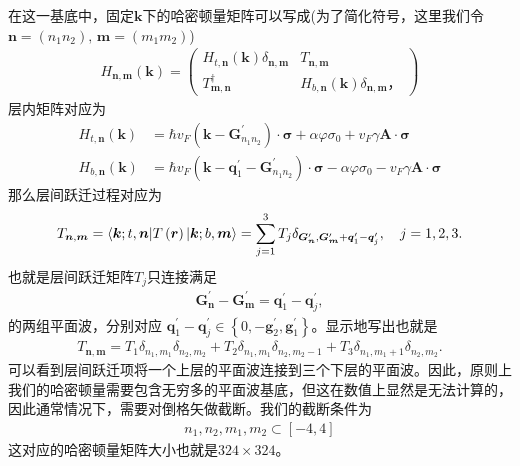 \documentclass[10pt, oneside]{article}
\begin{document}
在这一基底中，固定\(\bm{k }\)下的哈密顿量矩阵可以写成(为了简化符号，这里我们令\(\bm{n } = \left(n_{1} n_{2}\right),\, \bm{m } = \left(m_{1} m_{2}\right)\))
\begin{align}
	H_{\bm{n}, \bm{m}} \left(\bm{k }\right) = \begin{pmatrix}
		H_{t, \bm{n}} \left(\bm{k}\right) \delta_{\bm{n}, \bm{m}} & T_{\bm{n }, \bm{m }} \\
		T^{\dagger}_{\bm{m }, \bm{n}} &  H_{b, \bm{n}} \left(\bm{k}\right) \delta_{\bm{n}, \bm{m}}，
	\end{pmatrix}
\end{align}
层内矩阵对应为
\begin{align}
	H_{t, \bm{n}} \left(\bm{k}\right) & = \hbar v_{F} \left(\bm{k} - \bm{G}^{\prime}_{n_{1} n_{2}}\right)\cdot \bm{\sigma} + \alpha \varphi \sigma_{0} + v_{F} \gamma \bm{A } \cdot \bm{\sigma} \\
	H_{b, \bm{n}} \left(\bm{k}\right) & = \hbar v_{F} \left(\bm{k} - \bm{q }^{\prime}_{1} - \bm{G}^{\prime}_{n_{1} n_{2}}\right)\cdot \bm{\sigma} - \alpha \varphi \sigma_{0} - v_{F} \gamma \bm{A } \cdot \bm{\sigma}
\end{align}
那么层间跃迁过程对应为
\begin{align}
	T_{\bm{n }, \bm{m }} = \braket{\bm{k }; t, \bm{n }  | T \left(\bm{r}\right) | \bm{k }; b, \bm{m}} = \sum_{j = 1}^{3} T_{j} \delta_{\bm{G}^{\prime}_{\bm{n }}, \bm{G }^{\prime}_{\bm{m}} + \bm{q }^{\prime}_{1} - \bm{q }^{\prime}_{j}}, \quad j = 1,2,3.
\end{align}
也就是层间跃迁矩阵\(T_j\)只连接满足
\begin{align}
	\bm{G}^{\prime}_{\bm{n }} - \bm{G }^{\prime}_{\bm{m}} = \bm{q }^{\prime}_{1} - \bm{q }^{\prime}_{j},
\end{align}
的两组平面波，分别对应 \(\bm{q }^{\prime}_{1} - \bm{q }^{\prime}_{j} \in \left\{0, - \bm{g }^{\prime}_{2}, \bm{g }^{\prime}_{1}\right\}\)。显示地写出也就是
\begin{align}
	T_{\bm{n }, \bm{m }}  = T_1 \delta_{n_{1}, m_{1}} \delta_{n_{2}, m_{2}} + T_2 \delta_{n_1, m_{1}} \delta_{n_{2}, m_{2} - 1} + T_{3} \delta_{n_{1}, m_{1} + 1} \delta_{n_{2}, m_{2}}.
\end{align}
可以看到层间跃迁项将一个上层的平面波连接到三个下层的平面波。因此，原则上我们的哈密顿量需要包含无穷多的平面波基底，但这在数值上显然是无法计算的，因此通常情况下，需要对倒格矢做截断。我们的截断条件为
\begin{align}
	n_{1}, n_{2}, m_{1}, m_{2} \subset \left[-4, 4\right]
\end{align}
这对应的哈密顿量矩阵大小也就是\(324 \times 324\)。
\end{document}
